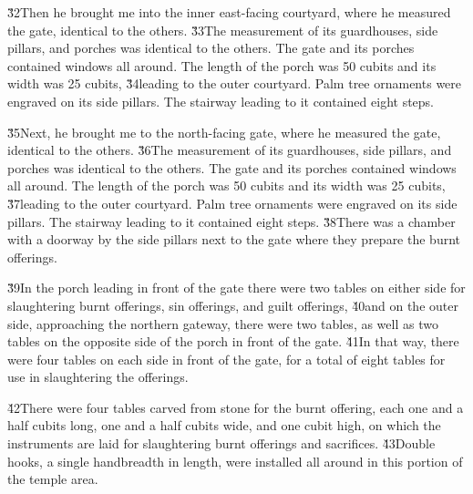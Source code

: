 \v{32}Then he brought me into the inner east-facing courtyard, where he measured the gate, identical to the others. \v{33}The measurement of its guardhouses, side pillars, and porches was identical to the others. The gate and its porches contained windows all around. The length of the porch was 50 cubits and its width was 25 cubits, \v{34}leading to the outer courtyard. Palm tree ornaments were engraved on its side pillars. The stairway leading to it contained eight steps.

\v{35}Next, he brought me to the north-facing gate, where he measured the gate, identical to the others. \v{36}The measurement of its guardhouses, side pillars, and porches was identical to the others. The gate and its porches contained windows all around. The length of the porch was 50 cubits and its width was 25 cubits, \v{37}leading to the outer courtyard. Palm tree ornaments were engraved on its side pillars. The stairway leading to it contained eight steps. \v{38}There was a chamber with a doorway by the side pillars next to the gate where they prepare the burnt offerings.

\v{39}In the porch leading in front of the gate there were two tables on either side for slaughtering burnt offerings, sin offerings, and guilt offerings, \v{40}and on the outer side, approaching the northern gateway, there were two tables, as well as two tables on the opposite side of the porch in front of the gate. \v{41}In that way, there were four tables on each side in front of the gate, for a total of eight tables for use in slaughtering the offerings.

\v{42}There were four tables carved from stone for the burnt offering, each one and a half cubits long, one and a half cubits wide, and one cubit high, on which the instruments are laid for slaughtering burnt offerings and sacrifices. \v{43}Double hooks, a single handbreadth in length, were installed all around in this portion of the temple area.

